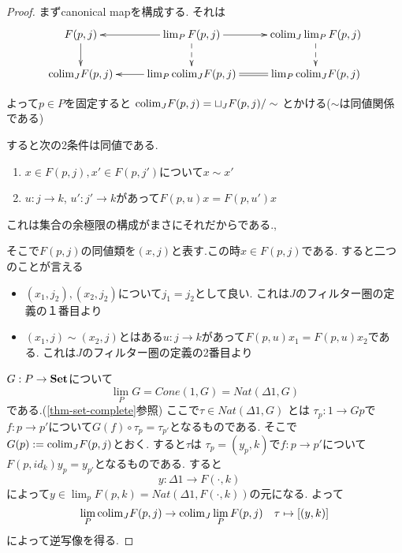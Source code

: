 \documentclass[dvipdfmx,a4paper,11pt]{article}
\newcommand{\colim}{{\rm colim}}
\theoremstyle{definition}
\begin{document}
\begin{proof}
まずcanonical mapを構成する.
それは
\begin{equation*}
\xymatrix@C=25pt@R=20pt{
F(p,j)\ar@{->}[d]
& \lim_{P} F(p,j)\ar@{-->}[d]\ar@{->}[l]\ar@{->}[r]
&\colim_{J}\lim_{P} F(p,j)\ar@{-->}[d]
\\
\colim_{J}F(p,j)
&\lim_{P}\colim_{J}F(p,j)\ar@{->}[l]
&\lim_{P}\colim_{J}F(p,j)\ar@{=}[l] \\   
}
\end{equation*}


よって$p \in P$を固定すると
$\colim_{J}F(p,j) = \sqcup_{J} F(p,j)/\sim$
とかける($\sim$は同値関係である)

すると次の2条件は同値である.
\begin{enumerate}
\item $x \in F(p,j), x' \in F(p,j')$について$x \sim x'$
\item $u : j \to k$, $u': j' \to k$があって$F(p,u)x = F(p,u')x$
\end{enumerate}
これは集合の余極限の構成がまさにそれだからである.,

そこで$F(p,j)$の同値類を$(x,j)$と表す.この時$x \in F(p,j)$である.
すると二つのことが言える
\begin{itemize}
\item $(x_1, j_2), (x_2, j_2)$について$j_1=j_2$として良い. これは$J$のフィルター圏の定義の１番目より
\item $(x_1, j)\sim (x_2, j)$とはある$u : j \to k$があって$F(p,u)x_1 =F(p,u)x_2$である.
 これは$J$のフィルター圏の定義の2番目より
\end{itemize}

$G : P \to {\bf Set}$について
$$
\lim_{P} G = Cone(1, G)=Nat(\Delta 1 , G)
$$
である.(\ref{thm-set-complete}参照)
ここで$\tau \in Nat(\Delta 1 , G)$
とは
$\tau_p: 1 \to Gp$で$f : p \to p'$について$G(f) \circ \tau_p = \tau_{p'}$となるものである. 
そこで$G(p):=\colim_{J}F(p,j)$とおく. すると$\tau$は
$\tau_p = (y_p, k)$で$f : p \to p'$について$F(p,id_{k})y_p = y_{p'}$となるものである.
すると
$$
y : \Delta 1 \to F(\cdot, k)
\quad
$$
によって$y \in \lim_{p}F(p,k)=Nat(\Delta 1 , F(\cdot, k))$の元になる.
よって
$$
\lim_{P} \colim_{J}F(p,j) \to \colim_{J} \lim_{P} F(p,j) 
\quad
\tau \mapsto [(y, k)]
$$
によって逆写像を得る. 

\end{proof}
\end{document}
